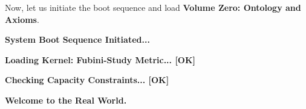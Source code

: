 Now, let us initiate the boot sequence and load \textbf{Volume Zero: Ontology and Axioms}.

\textbf{System Boot Sequence Initiated...}

\textbf{Loading Kernel: Fubini-Study Metric... [OK]}

\textbf{Checking Capacity Constraints... [OK]}

\textbf{Welcome to the Real World.}

